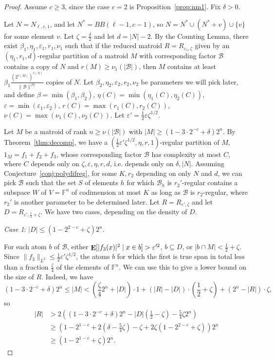 \documentclass{article}
\theoremstyle{plain}
\theoremstyle{definition}
\theoremstyle{definition}
\theoremstyle{remark}
\numberwithin{equation}{section}
\newcommand{\FF}{\mathbb{F}}
\newcommand{\Esymb}{{\bf E}}
\DeclareMathOperator*{\E}{\Esymb}
\newcommand{\cB}{\mathcal B}
\begin{document}
\begin{proof}
Assume $c\geq 3$, since the case $c=2$ is Proposition~\ref{prop:nm1}. Fix $\delta>0$.

Let $N=N_{\ell,c,1}$, and let $N^*=BB(\ell-1,c-1)$, so $N=N^*\cup (N^*+v)\cup \{v\}$ for some element $v$. Let $\zeta=\frac{\delta}{2}$ and let $d=|N|-2$. By the Counting Lemma, there exist $\beta_1, \eta_1, \varepsilon_1, r_1, \nu_1$ such that if the reduced matroid $R=R_{\varepsilon_1,\zeta}$ given by an $(\eta_1,r_1,d)$-regular partition of a matroid $M$ with corresponding factor $\cB$ contains a copy of $N$ and $r(M)\geq \nu_1(|\cB|)$, then $M$ contains at least $\beta_1 \frac{(2^{r(M)})^{r(N)}}{\|\cB\|^{|N|}}$ copies of $N$. Let $\beta_2,\eta_2,\varepsilon_2,r_2,\nu_2$ be parameters we will pick later, and define $\beta=\min(\beta_1,\beta_2)$, $\eta(C)=\min(\eta_1(C),\eta_2(C))$, $\varepsilon=\min(\varepsilon_1,\varepsilon_2)$, $r(C)=\max(r_1(C),r_2(C))$, $\nu(C)=\max(\nu_1(C),\nu_2(C))$. Let $\varepsilon'=\frac{1}{2}\varepsilon \zeta^{1/2}$.

Let $M$ be a matroid of rank $n\geq \nu(|\cB|)$ with $|M|\geq (1-3\cdot 2^{-c}+\delta)2^n$. By Theorem~\ref{thm:decomp}, we have a $(\frac{1}{2}\varepsilon'\zeta^{1/2},\eta,r,1)$-regular partition of $M$, $1_M=f_1+f_2+f_3$, whose corresponding factor $\cB$ has complexity at most $C$, where $C$ depends only on $\zeta,\varepsilon,\eta,r,d$, i.e. depends only on $\delta, |N|$. Assuming Conjecture~\ref{conj:polydifreg}, for some $K,r_2$ depending on only $N$ and $d$, we can pick $\cB$ such that the set $S$ of elements $h$ for which $\cB_h$ is $r_2'$-regular contains a subspace $W$ of $V=\FF^n$ of codimension at most $K$ as long as $\cB$ is $r_2$-regular, where $r_2'$ is another parameter to be determined later. Let $R=R_{\varepsilon',\zeta}$ and let $D=R_{\varepsilon',\frac{1}{2}+\zeta}$. 
We have two cases, depending on the density of $D$.

\emph{Case 1}: $|D|\leq (1-2^{2-c}+\zeta)2^n$.

For each atom $b$ of $\cB$, either $\E[|f_3(x)|^2\mid x\in b]> \varepsilon'^2$, $b\subseteq D$, or $|b\cap M| < \frac{1}{2}+\zeta$. Since $\|f_3\|_{L^2}\leq \frac{1}{2}\varepsilon'\zeta^{1/2}$, the atoms $b$ for which the first is true span in total less than a fraction $\frac{\zeta}{4}$ of the elements of $\FF^n$. We can use this to give a lower bound on the size of $R$. Indeed, we have
\[(1-3\cdot 2^{-c}+\delta)2^n\leq |M|< (\frac{\zeta}{4} 2^n + |D|) \cdot 1 + (|R|-|D|)\cdot (\frac{1}{2}+\zeta) + (2^n-|R|)\cdot \zeta,\]
so
\begin{align*}
    |R| &> 2\left((1-3\cdot 2^{-c}+\delta)2^n - |D|\left(\frac{1}{2}-\zeta\right)-\frac{5}{4}\zeta 2^n\right) \\
    &\geq \left(1-2^{1-c}+2(\delta -\frac{5}{4}\zeta)-\zeta + 2\zeta(1-2^{2-c}+\zeta)\right)2^n\\
    &\geq (1-2^{1-c}+\zeta)2^n.
\end{align*}


\end{proof}
\end{document}

